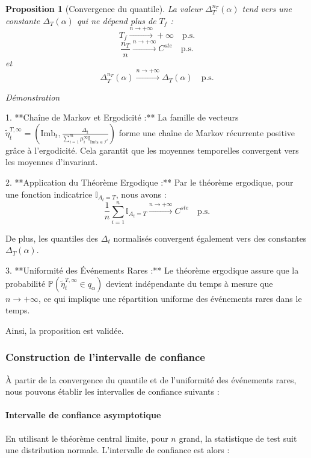 \documentclass[12pt,a4paper]{article}
\newtheorem{proposition}[theorem]{Proposition}
\theoremstyle{definition}
\theoremstyle{remark}
\begin{document}
\begin{proposition}[Convergence du quantile]
La valeur $\Delta_T^{n_T}(\alpha)$ tend vers une constante $\Delta_T(\alpha)$ qui ne dépend plus de $T_f$ :
$$
T_f \xrightarrow{n \to +\infty} +\infty \quad \text{p.s.}
$$
$$
\frac{n_T}{n} \xrightarrow{n \to +\infty} C^{ste} \quad \text{p.s.}
$$
et
$$
\Delta_T^{n_T}(\alpha) \xrightarrow{n \to +\infty} \Delta_T(\alpha) \quad \text{p.s.}
$$
\end{proposition}

\textit{Démonstration}

1. **Chaîne de Markov et Ergodicité :** 
   La famille de vecteurs $\tilde{\eta}_t^{T,\infty} = \left(\text{Imb}_t, \frac{\Delta_t}{\sum_{i=1}^m \mu_i^{\infty} \mathbb{I}_{\text{Imb}_t \in \mathcal{I}^{i}}}\right)$ forme une chaîne de Markov récurrente positive grâce à l'ergodicité. Cela garantit que les moyennes temporelles convergent vers les moyennes d'invariant.

2. **Application du Théorème Ergodique :** 
   Par le théorème ergodique, pour une fonction indicatrice $\mathbb{I}_{A_t = T}$, nous avons :
   $$
   \frac{1}{n} \sum_{i=1}^n \mathbb{I}_{A_t = T} \xrightarrow{n \to +\infty} C^{ste} \quad \text{p.s.}
   $$
   
   De plus, les quantiles des $\Delta_t$ normalisés convergent également vers des constantes $\Delta_T(\alpha)$.

3. **Uniformité des Événements Rares :**
   Le théorème ergodique assure que la probabilité $\mathbb{P}\left(\tilde{\eta}_t^{T,\infty} \in q_{\alpha}\right)$ devient indépendante du temps à mesure que $n \to +\infty$, ce qui implique une répartition uniforme des événements rares dans le temps.

Ainsi, la proposition est validée.

\subsubsection{Construction de l'intervalle de confiance}

À partir de la convergence du quantile et de l'uniformité des événements rares, nous pouvons établir les intervalles de confiance suivants :

\paragraph{Intervalle de confiance asymptotique}

En utilisant le théorème central limite, pour $n$ grand, la statistique de test suit une distribution normale. L'intervalle de confiance est alors :
\end{document}
